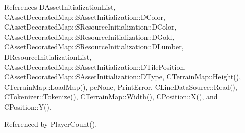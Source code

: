 References D\+Asset\+Initialization\+List, C\+Asset\+Decorated\+Map\+::\+S\+Asset\+Initialization\+::\+D\+Color, C\+Asset\+Decorated\+Map\+::\+S\+Resource\+Initialization\+::\+D\+Color, C\+Asset\+Decorated\+Map\+::\+S\+Resource\+Initialization\+::\+D\+Gold, C\+Asset\+Decorated\+Map\+::\+S\+Resource\+Initialization\+::\+D\+Lumber, D\+Resource\+Initialization\+List, C\+Asset\+Decorated\+Map\+::\+S\+Asset\+Initialization\+::\+D\+Tile\+Position, C\+Asset\+Decorated\+Map\+::\+S\+Asset\+Initialization\+::\+D\+Type, C\+Terrain\+Map\+::\+Height(), C\+Terrain\+Map\+::\+Load\+Map(), pc\+None, Print\+Error, C\+Line\+Data\+Source\+::\+Read(), C\+Tokenizer\+::\+Tokenize(), C\+Terrain\+Map\+::\+Width(), C\+Position\+::\+X(), and C\+Position\+::\+Y().



Referenced by Player\+Count().


